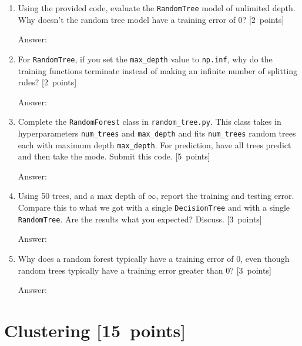 \documentclass{article}
\newcommand{\blu}[1]{{\textcolor{blu}{#1}}}
\newenvironment{answer}{\par\begingroup\color{gre}Answer: }{\endgroup}
\let\ask\blu
\newcommand\pts[1]{\textcolor{pointscolour}{[#1~points]}}
\begin{document}
    \begin{enumerate}
        \item Using the provided code, evaluate the \texttt{RandomTree} model of unlimited depth. \ask{Why doesn't the random tree model have a training error of 0?} \pts{2}
        \begin{answer}

        \end{answer}
        \item For \texttt{RandomTree}, if you set the \texttt{max\_depth} value to \texttt{np.inf}, \ask{why do the training functions terminate instead of making an infinite number of splitting rules?} \pts{2}
        \begin{answer}

        \end{answer}
        \item Complete the \texttt{RandomForest} class in \texttt{random\string_tree.py}. This class takes in hyperparameters \texttt{num\string_trees} and \texttt{max\string_depth} and
        fits \texttt{num\string_trees} random trees each with maximum depth \texttt{max\string_depth}. For prediction, have all trees predict and then take the mode. \ask{Submit this code.} \pts{5}
        \begin{answer}

        \end{answer}
        \item Using 50 trees, and a max depth of $\infty$, \ask{report the training and testing error}. Compare this to what we got with a single \texttt{DecisionTree} and with a single \texttt{RandomTree}. \ask{Are the results what you expected? Discuss.} \pts{3}
        \begin{answer}

        \end{answer}
        \item \ask{Why does a random forest typically have a training error of 0, even though random trees typically have a training error greater than 0?} \pts{3}
        \begin{answer}

        \end{answer}
    \end{enumerate}


    \clearpage
    \section{Clustering \pts{15}}
\end{document}
